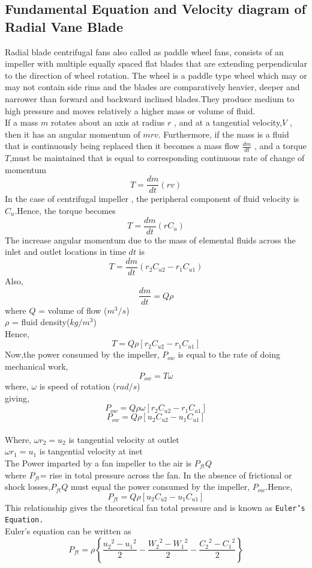\documentclass[11pt]{article}
\begin{document}
\subsection{Fundamental Equation and Velocity diagram of Radial Vane Blade}
Radial blade centrifugal fans also called as paddle wheel fans, consists of an impeller with multiple equally spaced flat blades that are extending perpendicular to the direction of wheel rotation. The wheel is a paddle type wheel which may or may not contain side rims and the blades are comparatively heavier, deeper and narrower than forward and backward inclined blades.They produce medium to high pressure and moves relatively a higher mass or volume of fluid.\\
If a mass $m$ rotates about an axis at radius $r$ , and at a tangential velocity,$V$ , then it has an angular momentum of $mrv$. Furthermore, if the mass is a fluid that is continuously being replaced then it becomes a mass flow $\frac{dm}{dt}$ , and a torque $T$,must be maintained that is equal to corresponding continuous rate of change of momentum$$T=\frac{dm}{dt}(rv)$$
In the case of centrifugal impeller , the peripheral component of fluid velocity is $C_u$.Hence, the torque becomes
$$T=\frac{dm}{dt}(rC_u)$$
The increase angular momentum due to the mass of elemental fluids across the inlet and outlet locations in time $dt$ is
$$T=\frac{dm}{dt}(r_2C_{u2}-r_1C_{u1})$$
Also,
$$\frac{dm}{dt} = Q\rho$$
where $Q$ = volume of flow ($m^3/s$)\\
 $\rho$ = fluid density($kg/m^3$)\\
 Hence,\\
 $$ T= Q\rho[r_2C_{u2}-r_1C_{u1}]$$
        Now,the power consumed by the impeller, $P_{ow}$ is equal to the rate of doing mechanical work,
        $$P_{ow} =T\omega$$
        where, $\omega$ is speed of rotation ($rad/s$)\\
        giving, 
        $$P_{ow} =Q\rho\omega[r_2C_{u2}-r_1C_{u1}]$$
        $$P_{ow} =Q\rho[u_2C_{u2}-u_1C_{u1}]$$\\
        Where, $\omega r_2=u_2$ is tangential velocity at outlet\\
         $\omega r_1=u_1$ is tangential velocity at inet\\
       The Power imparted by a fan impeller to the air is $P_{ft}Q$\\
       where $P_{ft}$= rise in total pressure across the fan.
       In the absence of frictional or shock losses,$P_{ft}Q$ must equal the power consumed by the impeller, $P_{ow}$.Hence,
       $$P_{ft}=Q\rho[u_2C_{u2}-u_1C_{u1}]$$
       This relationship gives the theoretical fan total pressure and is known as \texttt{Euler's Equation.}\\
       Euler's equation can be written as 
       $$P_{ft}=\rho \left\lbrace\frac{{u_2}^2-{u_1}^2}{2}-\frac{{W_2}^2-{W_1}^2}{2}-\frac{{C_2}^2-{C_1}^2}{2}\right\rbrace$$
       
\end{document}
